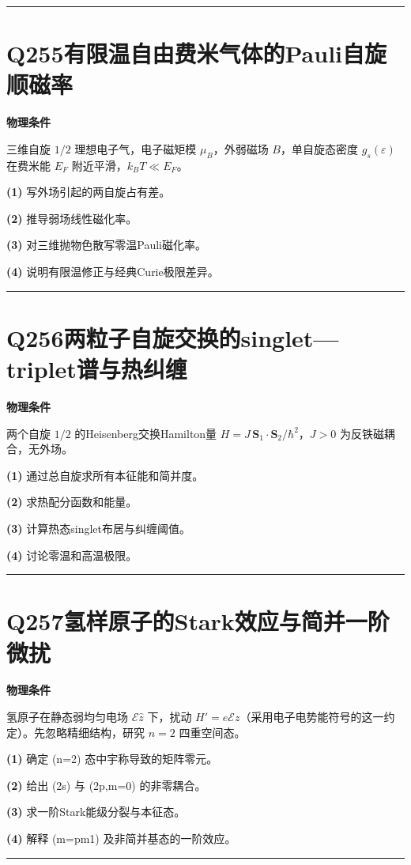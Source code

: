 \documentclass[UTF8,a4paper,11pt,oneside,openany]{ctexbook}
\begin{document}
\par\bigskip\hrule\bigskip
\section*{Q255\quad 有限温自由费米气体的Pauli自旋顺磁率}
\textbf{物理条件}\par 三维自旋 \(1/2\) 理想电子气，电子磁矩模 \(\mu_B\)，外弱磁场 \(B\)，单自旋态密度 \(g_s(\varepsilon)\) 在费米能 \(E_F\) 附近平滑，\(k_BT\ll E_F\)。
\par\noindent\textbf{(1)} 写外场引起的两自旋占有差。
\par\noindent\textbf{(2)} 推导弱场线性磁化率。
\par\noindent\textbf{(3)} 对三维抛物色散写零温Pauli磁化率。
\par\noindent\textbf{(4)} 说明有限温修正与经典Curie极限差异。

\par\bigskip\hrule\bigskip
\section*{Q256\quad 两粒子自旋交换的singlet—triplet谱与热纠缠}
\textbf{物理条件}\par 两个自旋 \(1/2\) 的Heisenberg交换Hamilton量 \(H=J\,\boldsymbol S_1\cdot\boldsymbol S_2/\hbar^2\)，\(J>0\) 为反铁磁耦合，无外场。
\par\noindent\textbf{(1)} 通过总自旋求所有本征能和简并度。
\par\noindent\textbf{(2)} 求热配分函数和能量。
\par\noindent\textbf{(3)} 计算热态singlet布居与纠缠阈值。
\par\noindent\textbf{(4)} 讨论零温和高温极限。

\par\bigskip\hrule\bigskip
\section*{Q257\quad 氢样原子的Stark效应与简并一阶微扰}
\textbf{物理条件}\par 氢原子在静态弱均匀电场 \(\mathcal E\hat z\) 下，扰动 \(H' = e\mathcal E z\)（采用电子电势能符号的这一约定）。先忽略精细结构，研究 \(n=2\) 四重空间态。
\par\noindent\textbf{(1)} 确定 (n=2) 态中宇称导致的矩阵零元。
\par\noindent\textbf{(2)} 给出 (2s) 与 (2p,m=0) 的非零耦合。
\par\noindent\textbf{(3)} 求一阶Stark能级分裂与本征态。
\par\noindent\textbf{(4)} 解释 (m=pm1) 及非简并基态的一阶效应。

\par\bigskip\hrule\bigskip
\end{document}
